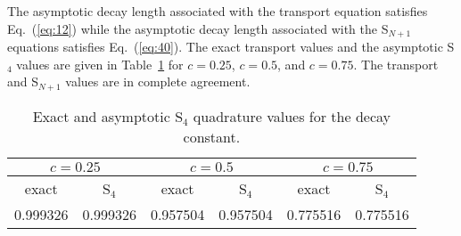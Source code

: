 \documentclass[12pt]{article}
\newcommand{\EQ}[1]{Eq.~(\ref{eq:#1})}
\newcommand{\LTA}[1]{\label{ta:#1}}
\newcommand{\TA}[1]{Table~\ref{ta:#1}}
\begin{document}
The asymptotic decay length associated with the transport equation satisfies \EQ{12} while the asymptotic decay length associated with the S$_{N+1}$ equations satisfies \EQ{40}. 
The exact transport values and the asymptotic S$_4$ values are given in \TA{3} for $c=0.25$, $c=0.5$, and $c=0.75$.
The transport and S$_{N+1}$ values are in complete agreement.  
\begin{table}[!htbp]
\begin{center} 
\begin{tabular}{|c|c|c|c|c|c|}
\hline
\hline
\multicolumn{2}{|c|}{$c=0.25$}&\multicolumn{2}{|c|}{$c=0.5$}&\multicolumn{2}{|c|}{$c=0.75$}\\
\hline
 exact & S$_4$ & exact & S$_4$ & exact & S$_4$ \\
 \hline
0.999326  & 0.999326  & 0.957504  &  0.957504 &  0.775516  & 0.775516 \\
\hline
\hline
\end{tabular}
\caption{Exact and asymptotic S$_4$ quadrature values for the decay constant.}
\LTA{3}
\end{center}
\end{table} 
\afterpage{\clearpage}
\end{document}
